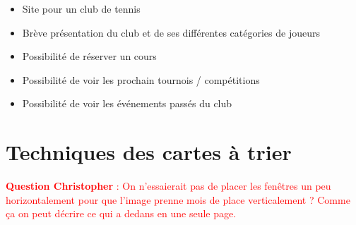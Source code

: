 \documentclass{article}[12pt]
\begin{document}
\begin{itemize}
	\item Site pour un club de tennis
    \item Brève présentation du club et de ses différentes catégories de joueurs
    \item Possibilité de réserver un cours
    \item Possibilité de voir les prochain tournois / compétitions
    \item Possibilité de voir les événements passés du club
\end{itemize}
\section{Techniques des cartes à trier}
\begin{figure}[H]
	\centering   {}
\end{figure}
\textcolor{red}{\textbf{Question Christopher} : On n'essaierait pas de placer les fenêtres un peu horizontalement pour que l'image prenne mois de place verticalement ? Comme ça on peut décrire ce qui a dedans en une seule page.}
\end{document}
